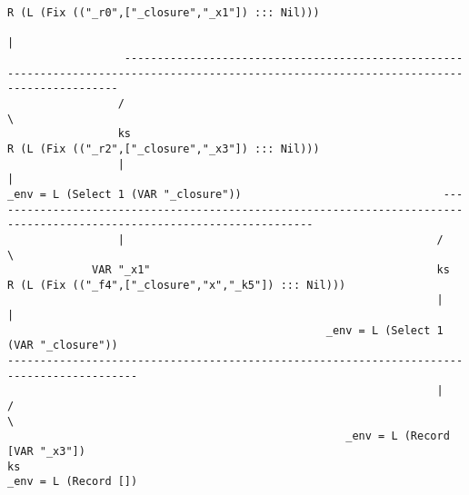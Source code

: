\begin{landscape}
\begin{lstlisting}[basicstyle=\fontsize{4.5}{5.5}\selectfont\ttfamily]
                                                                                                                   R (L (Fix (("_r0",["_closure","_x1"]) ::: Nil)))
                                                                                                                                          |
                  -------------------------------------------------------------------------------------------------------------------------------------------
                 /                                                                                                                                           \
                 ks                                                                                                                   R (L (Fix (("_r2",["_closure","_x3"]) ::: Nil)))
                 |                                                                                                                                           |
_env = L (Select 1 (VAR "_closure"))                               ------------------------------------------------------------------------------------------------------------------------
                 |                                                /                                                                                                                        \
             VAR "_x1"                                            ks                                                                                              R (L (Fix (("_f4",["_closure","x","_k5"]) ::: Nil)))
                                                                  |                                                                                                                        |
                                                 _env = L (Select 1 (VAR "_closure"))                                                                        ------------------------------------------------------------------------------------------
                                                                  |                                                                                         /                                                                                          \
                                                    _env = L (Record [VAR "_x3"])                                                                           ks                                                                                _env = L (Record [])

\end{lstlisting}
\end{landscape}
